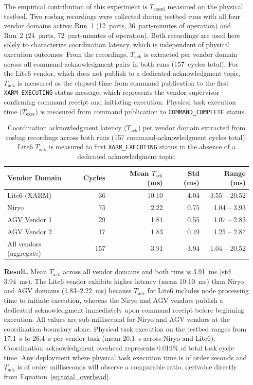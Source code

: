 \documentclass[a4paper,fleqn]{cas-dc}
\begin{document}
The empirical contribution of this experiment is $T_{\text{coord}}$ measured on the physical testbed. Two rosbag recordings were collected during testbed runs with all four vendor domains active: Run~1 (12~parts, 36~part-minutes of operation) and Run~2 (24~parts, 72~part-minutes of operation). Both recordings are used here solely to characterize coordination latency, which is independent of physical execution outcomes. From the recordings, $T_{\text{ack}}$ is extracted per vendor domain across all command-acknowledgment pairs in both runs (157~cycles total). For the Lite6 vendor, which does not publish to a dedicated acknowledgment topic, $T_{\text{ack}}$ is measured as the elapsed time from command publication to the first \texttt{XARM\_EXECUTING} status message, which represents the vendor supervisor confirming command receipt and initiating execution. Physical task execution time ($T_{\text{exec}}$) is measured from command publication to \texttt{COMMAND\_COMPLETE} status.

\begin{table}[h]
\centering
\caption{Coordination acknowledgment latency ($T_{\text{ack}}$) per vendor domain extracted from rosbag recordings across both runs (157 command-acknowledgment cycles total). Lite6 $T_{\text{ack}}$ is measured to first \texttt{XARM\_EXECUTING} status in the absence of a dedicated acknowledgment topic.}
\label{tab:rtt}
\begin{tabular}{lrrrr}
\toprule
\textbf{Vendor Domain} & \textbf{Cycles} & \textbf{Mean $T_{\text{ack}}$ (ms)} & \textbf{Std (ms)} & \textbf{Range (ms)} \\
\midrule
Lite6 (XARM)  & 36  & 10.10 & 4.04 & 3.55 -- 20.52 \\
Niryo         & 75  &  2.22 & 0.75 & 1.04 -- 3.93  \\
AGV Vendor 1  & 29  &  1.84 & 0.55 & 1.07 -- 2.83  \\
AGV Vendor 2  & 17  &  1.83 & 0.49 & 1.25 -- 2.87  \\
\midrule
All vendors (aggregate) & 157 & 3.91 & 3.94 & 1.04 -- 20.52 \\
\bottomrule
\end{tabular}
\end{table}

\textbf{Result.} Mean $T_{\text{ack}}$ across all vendor domains and both runs is 3.91~ms (std 3.94~ms). The Lite6 vendor exhibits higher latency (mean 10.10~ms) than Niryo and AGV domains (1.83--2.22~ms) because $T_{\text{ack}}$ for Lite6 includes node processing time to initiate execution, whereas the Niryo and AGV vendors publish a dedicated acknowledgment immediately upon command receipt before beginning execution. All values are sub-millisecond for Niryo and AGV vendors at the coordination boundary alone. Physical task execution on the testbed ranges from 17.1~s to 26.4~s per vendor task (mean 20.1~s across Niryo and Lite6). Coordination acknowledgment overhead represents 0.019\% of total task cycle time. Any deployment where physical task execution time is of order seconds and $T_{\text{ack}}$ is of order milliseconds will observe a comparable ratio, derivable directly from Equation~\ref{eq:total_overhead}.
\end{document}

